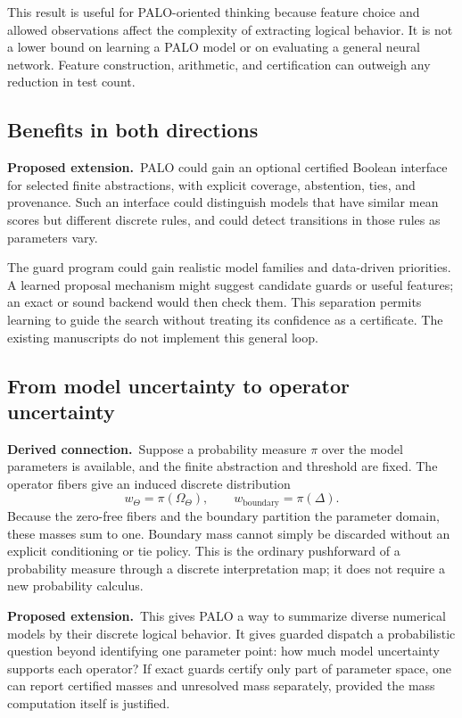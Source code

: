 \documentclass[11pt,a4paper]{article}
\theoremstyle{remark}
\newcommand{\derived}{\textbf{Derived connection.}\ }
\newcommand{\proposal}{\textbf{Proposed extension.}\ }
\begin{document}
This result is useful for PALO-oriented thinking because feature choice and allowed observations affect the complexity of extracting logical behavior. It is not a lower bound on learning a PALO model or on evaluating a general neural network. Feature construction, arithmetic, and certification can outweigh any reduction in test count.

\subsection{Benefits in both directions}
\proposal PALO could gain an optional certified Boolean interface for selected finite abstractions, with explicit coverage, abstention, ties, and provenance. Such an interface could distinguish models that have similar mean scores but different discrete rules, and could detect transitions in those rules as parameters vary.

The guard program could gain realistic model families and data-driven priorities. A learned proposal mechanism might suggest candidate guards or useful features; an exact or sound backend would then check them. This separation permits learning to guide the search without treating its confidence as a certificate. The existing manuscripts do not implement this general loop.

\subsection{From model uncertainty to operator uncertainty}
\derived Suppose a probability measure $\pi$ over the model parameters is available, and the finite abstraction and threshold are fixed. The operator fibers give an induced discrete distribution
\[
 w_\Theta=\pi(\Omega_\Theta),\qquad
 w_{\mathrm{boundary}}=\pi(\Delta).
\]
Because the zero-free fibers and the boundary partition the parameter domain, these masses sum to one. Boundary mass cannot simply be discarded without an explicit conditioning or tie policy. This is the ordinary pushforward of a probability measure through a discrete interpretation map; it does not require a new probability calculus.

\proposal This gives PALO a way to summarize diverse numerical models by their discrete logical behavior. It gives guarded dispatch a probabilistic question beyond identifying one parameter point: how much model uncertainty supports each operator? If exact guards certify only part of parameter space, one can report certified masses and unresolved mass separately, provided the mass computation itself is justified.
\end{document}
